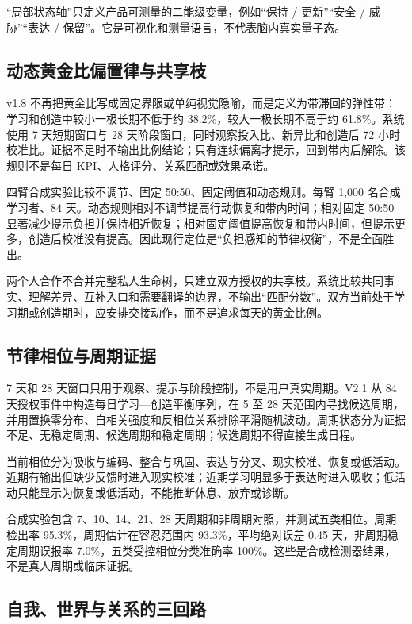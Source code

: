 \documentclass[UTF8,a4paper,11pt]{ctexart}
\begin{document}
“局部状态轴”只定义产品可测量的二能级变量，例如“保持 / 更新”“安全 / 威胁”“表达 / 保留”。它是可视化和测量语言，不代表脑内真实量子态。

\subsection{动态黄金比偏置律与共享枝}

v1.8 不再把黄金比写成固定界限或单纯视觉隐喻，而是定义为带滞回的弹性带：学习和创造中较小一极长期不低于约 38.2\%，较大一极长期不高于约 61.8\%。系统使用 7 天短期窗口与 28 天阶段窗口，同时观察投入比、新异比和创造后 72 小时校准比。证据不足时不输出比例结论；只有连续偏离才提示，回到带内后解除。该规则不是每日 KPI、人格评分、关系匹配或效果承诺。

四臂合成实验比较不调节、固定 50:50、固定阈值和动态规则。每臂 1,000 名合成学习者、84 天。动态规则相对不调节提高行动恢复和带内时间；相对固定 50:50 显著减少提示负担并保持相近恢复；相对固定阈值提高恢复和带内时间，但提示更多，创造后校准没有提高。因此现行定位是“负担感知的节律权衡”，不是全面胜出。

两个人合作不合并完整私人生命树，只建立双方授权的共享枝。系统比较共同事实、理解差异、互补入口和需要翻译的边界，不输出“匹配分数”。双方当前处于学习期或创造期时，应安排交接动作，而不是追求每天的黄金比例。

\subsection{节律相位与周期证据}

7 天和 28 天窗口只用于观察、提示与阶段控制，不是用户真实周期。V2.1 从 84 天授权事件中构造每日学习—创造平衡序列，在 5 至 28 天范围内寻找候选周期，并用置换零分布、自相关强度和反相位关系排除平滑随机波动。周期状态分为证据不足、无稳定周期、候选周期和稳定周期；候选周期不得直接生成日程。

当前相位分为吸收与编码、整合与巩固、表达与分叉、现实校准、恢复或低活动。近期有输出但缺少反馈时进入现实校准；近期学习明显多于表达时进入吸收；低活动只能显示为恢复或低活动，不能推断休息、放弃或诊断。

合成实验包含 7、10、14、21、28 天周期和非周期对照，并测试五类相位。周期检出率 95.3\%，周期估计在容忍范围内 93.3\%，平均绝对误差 0.45 天，非周期稳定周期误报率 7.0\%，五类受控相位分类准确率 100\%。这些是合成检测器结果，不是真人周期或临床证据。


\subsection{自我、世界与关系的三回路}
\end{document}
